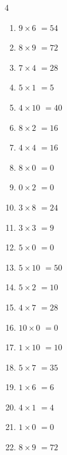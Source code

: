 \begin{multicols}{4}
\begin{enumerate}
  \item $9\times 6$
        $=54$

  \item $8\times 9$
        $=72$

  \item $7\times 4$
        $=28$

  \item $5\times 1$
        $=5$

  \item $4\times 10$
        $=40$

  \item $8\times 2$
        $=16$

  \item $4\times 4$
        $=16$

  \item $8\times 0$
        $=0$

\columnbreak %

\resetques

  \item $0\times 2$
        $=0$

  \item $3\times 8$
        $=24$

  \item $3\times 3$
        $=9$

  \item $5\times 0$
        $=0$

  \item $5\times 10$
        $=50$

  \item $5\times 2$
        $=10$

  \item $4\times 7$
        $=28$

  \item $10\times 0$
        $=0$

  \item $1\times 10$
        $=10$

  \item $5\times 7$
        $=35$

  \item $1\times 6$
        $=6$

  \item $4\times 1$
        $=4$

  \item $1\times 0$
        $=0$

  \item $8\times 9$
        $=72$


\end{enumerate}
\end{multicols}
